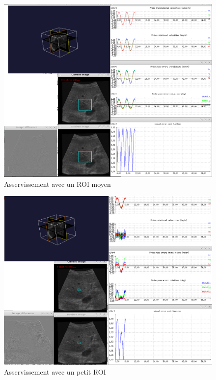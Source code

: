 \documentclass[a4paper,11pt]{article}
\begin{document}
\begin{figure}[!h]
    \centering
    \includegraphics[width=1.0\textwidth]{./images/q9_medium.png}
    \caption{Asservissement avec un ROI moyen}
    \label{mediumRoi}
\end{figure}

\begin{figure}[!h]
    \centering
    \includegraphics[width=1.0\textwidth]{./images/q9_small.png}
    \caption{Asservissement avec un petit ROI}
    \label{smallRoi}
\end{figure}
\end{document}
